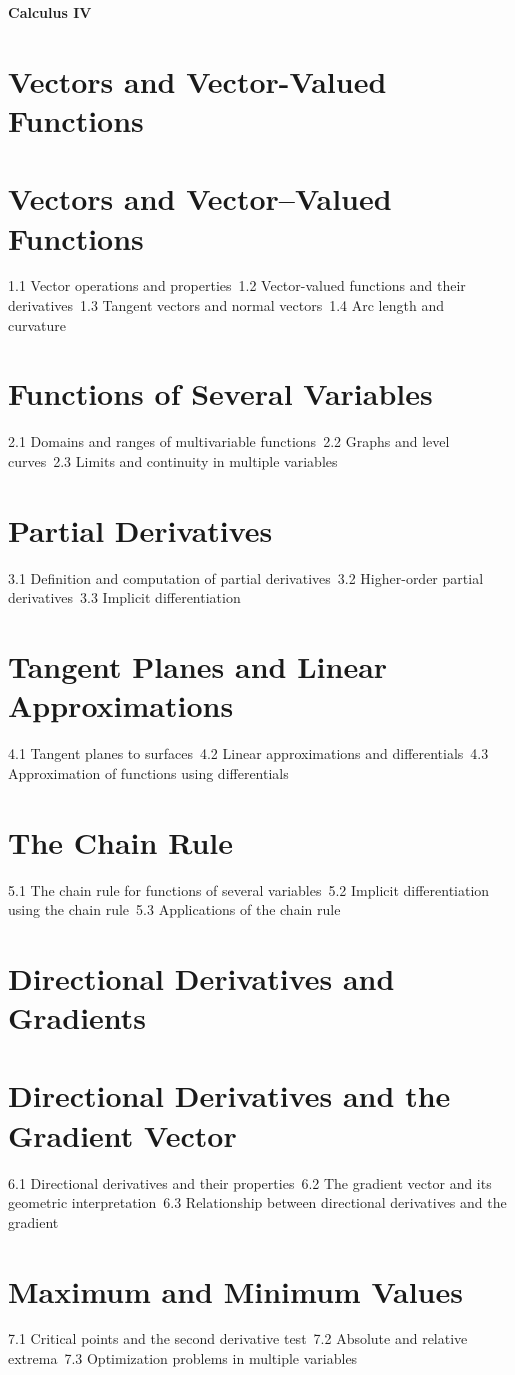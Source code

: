 {\LARGE \bf{Calculus IV}}
\section{Vectors and Vector-Valued Functions}
\section{Vectors and Vector–Valued Functions}
1.1 Vector operations and properties\
1.2 Vector-valued functions and their derivatives\
1.3 Tangent vectors and normal vectors\
1.4 Arc length and curvature\
\section{Functions of Several Variables}
2.1 Domains and ranges of multivariable functions\
2.2 Graphs and level curves\
2.3 Limits and continuity in multiple variables\
\section{Partial Derivatives}
3.1 Definition and computation of partial derivatives\
3.2 Higher-order partial derivatives\
3.3 Implicit differentiation\
\section{Tangent Planes and Linear Approximations}
4.1 Tangent planes to surfaces\
4.2 Linear approximations and differentials\
4.3 Approximation of functions using differentials\
\section{The Chain Rule}
5.1 The chain rule for functions of several variables\
5.2 Implicit differentiation using the chain rule\
5.3 Applications of the chain rule\
\section{Directional Derivatives and Gradients}
\section{Directional Derivatives and the Gradient Vector}
6.1 Directional derivatives and their properties\
6.2 The gradient vector and its geometric interpretation\
6.3 Relationship between directional derivatives and the gradient\
\section{Maximum and Minimum Values}
7.1 Critical points and the second derivative test\
7.2 Absolute and relative extrema\
7.3 Optimization problems in multiple variables\
